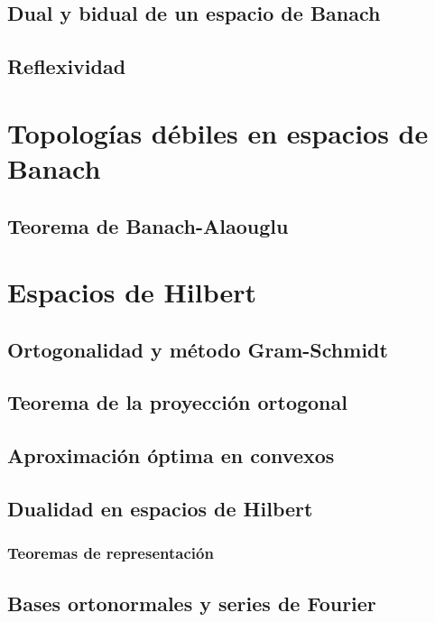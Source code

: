 \documentclass[palatino,nochap]{apuntes}
\begin{document}
\subsection{Dual y bidual de un espacio de Banach}

\subsection{Reflexividad}

\section{Topologías débiles en espacios de Banach}

\subsection{Teorema de Banach-Alaouglu}

\section{Espacios de Hilbert}

\subsection{Ortogonalidad y método Gram-Schmidt}

\subsection{Teorema de la proyección ortogonal}

\subsection{Aproximación óptima en convexos}

\subsection{Dualidad en espacios de Hilbert}

\subsubsection{Teoremas de representación}

\subsection{Bases ortonormales y series de Fourier}
\end{document}
